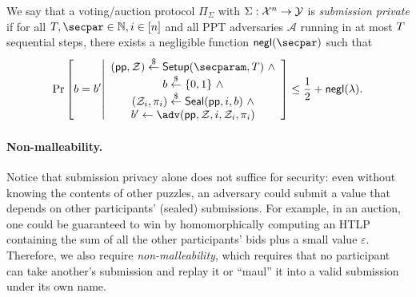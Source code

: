 \begin{definition}\label{def:submission_privacy}
We say that a voting/auction protocol $\Pi_\Sigma$ with $\Sigma: \mathcal{X}^n \to \mathcal{Y}$ is \emph{submission private} if for all $\Ttime,\secpar \in \mathbb{N}, i \in [n]$ and all PPT adversaries $\mathcal{A}$ running in at most $T$ sequential steps, there exists a negligible function $\negl$ such that 
\begin{equation*}
    \Pr\left[
        b=b'
        \middle|
        \begin{array}{c}
            (\pp, \Z) \sample \Setup(\secparam, \Ttime)~\land\\       
            b\sample\{0,1\}~\land\\
            (\Z_i, \pi_i) \sample \Seal(\pp, i, b)~\land\\
            b'\gets\adv(\pp,\Z,i, \Z_i, \pi_i)\\
        \end{array}
    \right]
    \leq \frac{1}{2} + \mathsf{negl}(\lambda).
\end{equation*}
\end{definition}

\paragraph{Non-malleability.} 
Notice that submission privacy alone does not suffice for security: even without knowing the contents of other puzzles, an adversary could submit a value that depends on other participants' (sealed) submissions. For example, in an auction, one could be guaranteed to win by homomorphically computing an HTLP containing the sum of all the other participants' bids plus a small value $\varepsilon$. Therefore, we also require \emph{non-malleability}, which requires that no participant can take another's submission and replay it or ``maul'' it into a valid submission under its own name.

